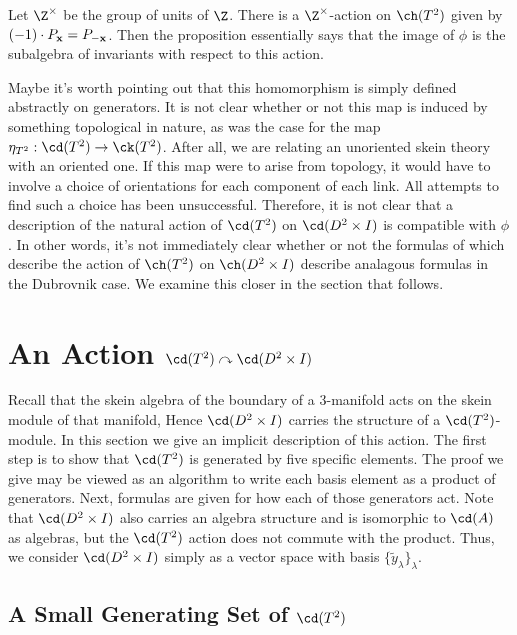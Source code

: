 Let $\Z^\times$ be the group of units of $\Z$. There is a $\Z^\times$-action on $\ch(T^2)$ given by $(-1) \cdot P_{{\mathbf{x}}} = P_{-{\mathbf{x}}}$. Then the proposition essentially says that the image of $\phi$ is the subalgebra of invariants with respect to this action.

\begin{remark}
Maybe it's worth pointing out that this homomorphism is simply defined abstractly on generators. It is not clear whether or not this map is induced by something topological in nature, as was the case for the map $\eta_{T^2}: \cd(T^2) \to \ck(T^2)$. After all, we are relating an unoriented skein theory with an oriented one. If this map were to arise from topology, it would have to involve a choice of orientations for each component of each link. All attempts to find such a choice has been unsuccessful. Therefore, it is not clear that a description of the natural action of $\cd(T^2)$ on $\cd(D^2 \times I)$ is compatible with $\phi$. In other words, it's not immediately clear whether or not the formulas of \cite{MS17} which describe the action of $\ch(T^2)$ on $\ch(D^2 \times I)$ describe analagous formulas in the Dubrovnik case. We examine this closer in the section that follows.
\end{remark}


\section{An Action $\cd(T^2) \curvearrowright \cd(D^2 \times I)$} \label{sec:action}

Recall that the skein algebra of the boundary of a 3-manifold acts on the skein module of that manifold, Hence $\cd(D^2 \times I)$ carries the structure of a $\cd(T^2)$-module. In this section we give an implicit description of this action. The first step is to show that $\cd(T^2)$ is generated by five specific elements. The proof we give may be viewed as an algorithm to write each basis element as a product of generators. Next, formulas are given for how each of those generators act. Note that $\cd(D^2 \times I)$ also carries an algebra structure and is isomorphic to $\cd(A)$ as algebras, but the $\cd(T^2)$ action does not commute with the product. Thus, we consider $\cd(D^2 \times I)$ simply as a vector space with basis $\{\tilde{y}_\lambda \}_\lambda$. 






\subsection{A Small Generating Set of $\cd(T^2)$} \label{sec:generators}

